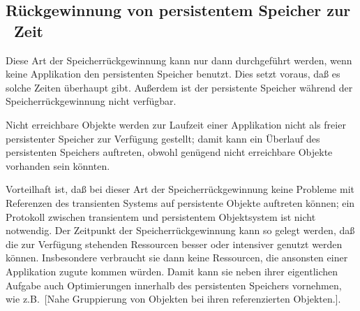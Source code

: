 \subsection{R\"{u}ckgewinnung von persistentem Speicher zur
\offline\ Zeit}
%
Diese Art der Speicherr\"{u}ckgewinnung kann nur dann durchgef\"{u}hrt
werden, wenn keine Applikation den persistenten Speicher benutzt.
Dies setzt voraus, da\ss{} es solche Zeiten \"{u}berhaupt gibt. Au\ss{}erdem
ist der persistente Speicher w\"{a}hrend der Speicherr\"{u}ckgewinnung nicht
verf\"{u}gbar.
%
\par{}Nicht erreichbare Objekte werden zur Laufzeit einer
Applikation nicht als freier persistenter Speicher zur
Verf\"{u}gung gestellt; damit kann ein \"{U}berlauf des persistenten
Speichers auftreten, obwohl gen\"{u}gend nicht erreichbare
Objekte vorhanden sein k\"{o}nnten.
%
\par{}Vorteilhaft ist, da\ss{} bei dieser Art der Speicherr\"{u}ckgewinnung
keine Probleme mit Referenzen des transienten Systems auf persistente
Objekte auftreten k\"{o}nnen; ein Protokoll zwischen transientem und
persistentem Objektsystem ist nicht notwendig. Der Zeitpunkt der
Spei\-cher\-r\"{u}ck\-ge\-win\-nung kann so gelegt werden, da\ss{} die zur
Verf\"{u}gung stehenden Ressourcen besser oder intensiver genutzt werden
k\"{o}nnen.  Insbesondere verbraucht sie dann keine Ressourcen, die
ansonsten einer Applikation zugute kommen w\"{u}rden. Damit kann sie
neben ihrer eigentlichen Aufgabe auch Optimierungen innerhalb des
persistenten Speichers vornehmen, wie z.B.\ [Nahe
Gruppierung von Objekten bei ihren referenzierten Objekten.].
%
